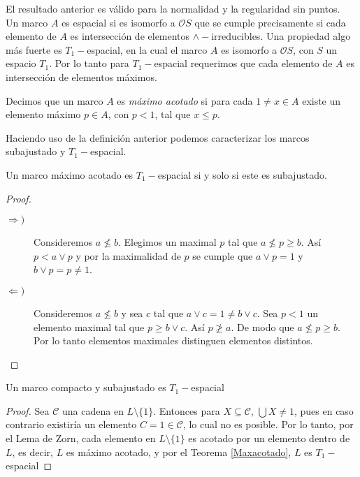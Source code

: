 \documentclass{comunicaciones}
\begin{document}
El resultado anterior es válido para la normalidad y la regularidad sin puntos.\\

Un marco $A$ es espacial si es isomorfo a $\mathcal{O}S$ que se cumple precisamente si cada elemento de $A$ es intersección de elementos $\wedge-$irreducibles. Una propiedad algo más fuerte es $T_1-$espacial, en la cual el marco $A$ es isomorfo a $\mathcal{O}S$, con $S$ un espacio $T_1$. Por lo tanto para $T_1-$espacial requerimos que cada elemento de $A$ es intersección de elementos máximos.

\begin{dfn}\label{Maximoacotado}
    Decimos que un marco $A$ es \emph{máximo acotado} si para cada $1\neq x\in A$ existe un elemento máximo $p\in A$, con $p< 1$, tal que $x\leq p$.
\end{dfn}

Haciendo uso de la definición anterior podemos caracterizar los marcos subajustado y $T_1-$espacial.

\begin{thm}\label{Maxacotado}
    Un marco máximo acotado es $T_1-$espacial si y solo si este es subajustado.
\end{thm}

\begin{proof}
    \begin{description}
        \item[$\Rightarrow )$] Consideremos $a\nleq b$. Elegimos un maximal $p$ tal que $a\nleq p \geq b$. Así $p< a\vee p$  y por la maximalidad de $p$ se cumple que $a\vee p=1$ y $b\vee p=p\neq 1$. 
        \item[$\Leftarrow )$] Consideremos $a\nleq b$ y sea $c$ tal que $a\vee c=1\neq b\vee c$. Sea  
        $p< 1$ un elemento maximal tal que $p\geq b\vee c$. Así $p\ngeq a$. De modo que $a\nleq p \geq b$. Por lo tanto elementos maximales distinguen elementos distintos.
    \end{description}
\end{proof}

\begin{thm}\label{EspecializacionIsbell}
    Un marco compacto y subajustado es $T_1-$espacial
\end{thm}

\begin{proof}
    Sea $\mathcal{C}$ una cadena en $L\setminus \{1\}$. Entonces para $X\subseteq \mathcal{C}$, $\bigcup X\neq 1$, pues en caso contrario existiría un elemento $C=1\in \mathcal{C}$, lo cual no es posible. Por lo tanto, por el Lema de Zorn, cada elemento en $L\setminus \{1\}$ es acotado por un elemento dentro de $L$, es decir, $L$ es máximo acotado, y por el Teorema \ref{Maxacotado}, $L$ es $T_1-$espacial
\end{proof}
\end{document}
